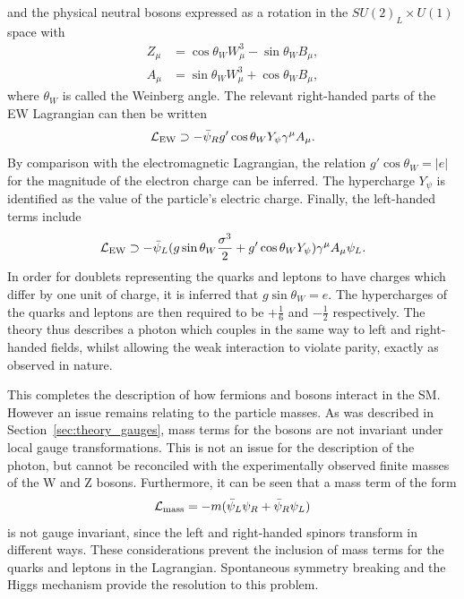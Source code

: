 and the physical neutral bosons expressed as a rotation in the $SU(2)_L \times U(1)$ space with
\begin{equation}
\label{eq:theory_rotation}
\begin{split}
Z_\mu &= \cos{\theta_W} W_\mu^3 - \sin{\theta_W} B_\mu , \\
A_\mu &= \sin{\theta_W} W_\mu^3 + \cos{\theta_W} B_\mu ,
\end{split}
\end{equation}
where $\theta_W$ is called the Weinberg angle.
The relevant right-handed parts of the EW Lagrangian can then be written
\begin{equation}
\mathcal{L}_{\textrm{EW}} \supset -\bar{\psi}_R g' \cos{\theta_W} Y_\psi \gamma^\mu A_\mu .
\end{equation}
By comparison with the electromagnetic Lagrangian, 
the relation $g' \cos{\theta_W} = |e|$ for the magnitude of the electron charge can be inferred.
The hypercharge $Y_\psi$ is identified as the value of the particle's electric charge.
Finally, the left-handed terms include
\begin{equation}
\mathcal{L}_{\textrm{EW}} \supset - \bar{\psi}_L(g\sin{\theta_W} \frac{\sigma^3}{2} 
                            + g' \cos{\theta_W} Y_\psi) \gamma^\mu A_\mu \psi_L .
\end{equation}
In order for doublets representing the quarks and leptons to have charges 
which differ by one unit of charge, it is inferred that $g\sin{\theta_W} = e$. 
The hypercharges of the quarks and leptons are then required to be 
$+\frac{1}{6}$ and $-\frac{1}{2}$ respectively.
The theory thus describes a photon which couples in the same way to left and right-handed fields, 
whilst allowing the weak interaction to violate parity, exactly as observed in nature.

This completes the description of how fermions and bosons interact in the SM.
However an issue remains relating to the particle masses.
As was described in Section~\ref{sec:theory_gauges}, 
mass terms for the bosons are not invariant under local gauge transformations.
This is not an issue for the description of the photon, 
but cannot be reconciled with the experimentally observed finite masses of the W and Z bosons.
Furthermore, it can be seen that a mass term of the form
\begin{equation}
\label{eq:theory_badmass}
\mathcal{L}_{\textrm{mass}} = -m(\bar{\psi}_L \psi_R + \bar{\psi}_R \psi_L)
\end{equation}
is not gauge invariant, since the left and right-handed spinors transform in different ways.
These considerations prevent the inclusion of mass terms 
for the quarks and leptons in the Lagrangian.
Spontaneous symmetry breaking and the Higgs mechanism provide the resolution to this problem.

